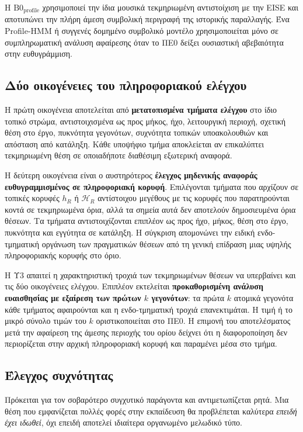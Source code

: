 \documentclass[11pt,a4paper]{article}
\begin{document}
Η $\mathrm{B0}_{\mathrm{profile}}$ χρησιμοποιεί την ίδια μουσικά τεκμηριωμένη αντιστοίχιση με την EISE και αποτυπώνει την πλήρη άμεση συμβολική περιγραφή της ιστορικής παραλλαγής. Ένα Profile-HMM ή συγγενές δομημένο συμβολικό μοντέλο χρησιμοποιείται μόνο σε συμπληρωματική ανάλυση αφαίρεσης όταν το ΠΕ0 δείξει ουσιαστική αβεβαιότητα στην ευθυγράμμιση.

\subsection{Δύο οικογένειες του πληροφοριακού ελέγχου}\label{app:match-info-controls}

Η πρώτη οικογένεια αποτελείται από \textbf{μετατοπισμένα τμήματα ελέγχου} στο ίδιο τοπικό στρώμα, αντιστοιχισμένα ως προς μήκος, ήχο, λειτουργική περιοχή, σχετική θέση στο έργο, πυκνότητα γεγονότων, συχνότητα τοπικών υποακολουθιών και απόσταση από κατάληξη. Κάθε υποψήφιο τμήμα αποκλείεται αν επικαλύπτει τεκμηριωμένη θέση σε οποιαδήποτε διαθέσιμη εξωτερική αναφορά.

Η δεύτερη οικογένεια είναι ο αυστηρότερος \textbf{έλεγχος μηδενικής αναφοράς ευθυγραμμισμένος σε πληροφοριακή κορυφή}. Επιλέγονται τμήματα που αρχίζουν σε τοπικές κορυφές \(h_R\) ή \(\mathcal H_R\) αντίστοιχου μεγέθους με τις κορυφές που παρατηρούνται κοντά σε τεκμηριωμένα όρια, αλλά τα σημεία αυτά δεν αποτελούν δημοσιευμένα όρια θέσεων. Τα τμήματα αντιστοιχίζονται επιπλέον ως προς ήχο, μήκος, θέση στο έργο, πυκνότητα και εγγύτητα σε κατάληξη. Η σύγκριση απομονώνει την ειδική ενδο-τμηματική οργάνωση των πραγματικών θέσεων από τη γενική επίδραση μιας υψηλής πληροφοριακής κορυφής στο όριο.

Η Υ3 απαιτεί η χαρακτηριστική τροχιά των τεκμηριωμένων θέσεων να υπερβαίνει και τις δύο οικογένειες ελέγχου. Επιπλέον εκτελείται \textbf{προκαθορισμένη ανάλυση ευαισθησίας με εξαίρεση των πρώτων \(k\) γεγονότων}: τα πρώτα \(k\) ατομικά γεγονότα κάθε τμήματος αφαιρούνται και η ενδο-τμηματική τροχιά επανεκτιμάται. Η τιμή ή το μικρό σύνολο τιμών του \(k\) οριστικοποιείται στο ΠΕ0. Η επιμονή του αποτελέσματος μετά την αφαίρεση της άμεσης περιοχής του ορίου δείχνει ότι η διαφοροποίηση δεν περιορίζεται στην αρχική πληροφοριακή κορυφή και παραμένει μέσα στο τμήμα.

\subsection{Έλεγχος συχνότητας}\label{app:match-frequency}

Πρόκειται για τον σοβαρότερο συγχυτικό παράγοντα και αντιμετωπίζεται ρητά. Μια θέση που εμφανίζεται πολλές φορές στην εκπαίδευση θα προβλέπεται καλύτερα \emph{επειδή έχει ιδωθεί}, όχι επειδή αποτελεί ιδιαίτερα οργανωμένο μελωδικό τύπο.
\end{document}
